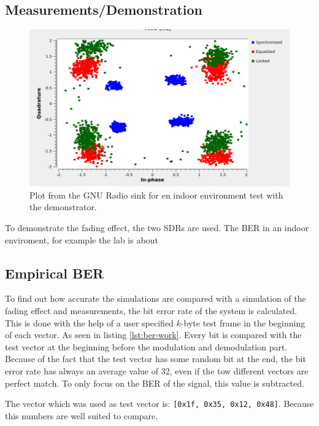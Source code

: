 \subsection{Measurements/Demonstration}

\begin{figure}
	\centering
	\includegraphics[frame, width = \linewidth]{figures/screenshots/Hardware_indoor.png}
	\caption{
		Plot from the GNU Radio sink for en indoor environment test with the demonstrator.
		\label{fig:GR-Hardware-indoor}
	}
\end{figure}
To demonstrate the fading effect, the two SDRs are used.
The BER in an indoor enviroment, for example the lab is about 


\subsection{Empirical BER} \label{sec:ber}
To find out how accurate the simulations are compared with a simulation of the fading effect and measurements, the bit error rate of the system is calculated. This is done with the help of a user specified \(k\)-byte test frame in the beginning of each vector. As seen in listing \ref{lst:ber-work}. Every bit is compared with the test vector at the beginning before the modulation and demodulation part. 
Because of the fact that the test vector has some random bit at the end, the bit error rate has always an average value of 32, even if the tow different vectors are  perfect match. To only focus on the BER of the signal, this value is subtracted. 

The vector which was used as test vector is: \texttt{[0x1f, 0x35, 0x12, 0x48]}. Because this numbers are well suited to compare.%


